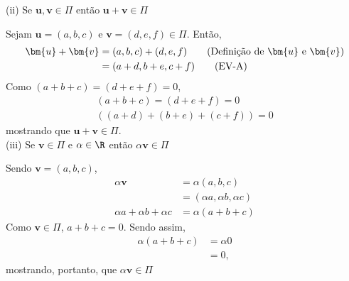 (ii) Se $\bm{u}, \bm{v} \in \Pi$ então $\bm{u} + \bm{v} \in \Pi$

Sejam $\bm{u}  = (a, b, c) $ e $\bm{v} = (d, e, f) \in \Pi$. Então,
    \begin{align*}
    \bm{u} + \bm{v} & = (a, b, c) + (d, e, f) \tag{Definição de $\bm{u}$ e $\bm{v}$} \\ 
    & = (a+d, b+e, c+f) \tag{EV-A}
    \end{align*}
Como $(a + b + c) = (d + e + f) = 0$, 
    \begin{align*}
    (a + b + c) = (d + e + f) = 0 \\
    ((a+d) + (b+e) + (c+f)) = 0
    \end{align*}
mostrando que $\bm{u} + \bm{v} \in \Pi$. \\

(iii) Se $\bm{v} \in \Pi$ e $\alpha \in \R$ então $\alpha\bm{v} \in \Pi$ 

Sendo $\bm{v} = (a, b, c)$, 
    \begin{align*}
    \alpha\bm{v} &= \alpha(a, b, c) \tag{EV-M} \\
    &= (\alpha a, \alpha b, \alpha c) \\
    \alpha a + \alpha b + \alpha c &= \alpha (a + b + c)
    \end{align*}
Como $\bm{v} \in \Pi$, $a + b + c = 0$. Sendo assim,
    \begin{align*}
    \alpha (a + b + c) &= \alpha 0\\
    &= 0,
    \end{align*}
mostrando, portanto, que $\alpha\bm{v} \in \Pi$